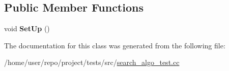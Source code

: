 \subsection*{Public Member Functions}
\begin{DoxyCompactItemize}
\item 
\mbox{\label{classSearchAlgoTest_aafd00801584600604aaed799afc35905}} 
void {\bfseries Set\+Up} ()
\end{DoxyCompactItemize}


The documentation for this class was generated from the following file\+:\begin{DoxyCompactItemize}
\item 
/home/user/repo/project/tests/src/\hyperlink{search__algo__test_8cc}{search\+\_\+algo\+\_\+test.\+cc}\end{DoxyCompactItemize}
